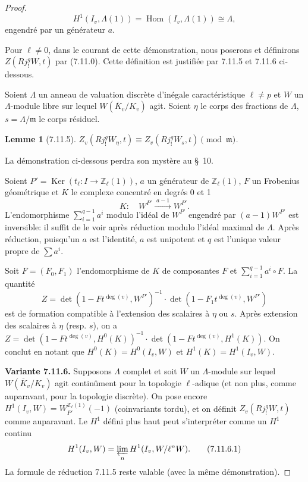\documentclass[11pt]{amsart}
\theoremstyle{plain}
\newtheorem{lemma}[theorem]{Lemme}
\theoremstyle{definition}
\DeclareMathOperator{\Hom}{Hom}
\DeclareMathOperator{\Ker}{Ker}
\begin{document}
\begin{proof}
\begin{equation}
H^1(I_v,\Lambda(1)) = \Hom(I_v,\Lambda(1)) \cong \Lambda,
\tag{7.11.3}
\end{equation}
engendr\'e par un g\'en\'erateur $a$.

Pour $\ell \not= 0$, dans le courant de cette d\'emonstration, nous poserons et d\'efinirons $Z(Rj_!^g W,t)$ par (7.11.0). Cette d\'efinition est justifi\'ee par 7.11.5 et 7.11.6 ci-dessous.

Soient $\Lambda$ un anneau de valuation discr\`ete d'in\'egale caract\'eristique $\ell \not= p$ et $W$ un $\Lambda$-module libre sur lequel $W(\overline{K}_v/K_v)$ agit. Soient $\eta$ le corps des fractions de $\Lambda$, $s = \Lambda/\mathfrak{m}$ le corps r\'esiduel.

\begin{lemma}[7.11.5]
$Z_v(Rj_!^g W_\eta,t) \equiv Z_v(Rj_!^g W_s,t) \pmod{\mathfrak{m}}$.
\end{lemma}

La d\'emonstration ci-dessous perdra son myst\`ere au \S\ 10.

Soient $P' = \Ker(t_\ell: I \to \mathbb{Z}_\ell(1))$, $a$ un g\'en\'erateur de $\mathbb{Z}_\ell(1)$, $F$ un Frobenius g\'eom\'etrique et $K$ le complexe concentr\'e en degr\'es 0 et 1
\[
K: \quad W^{P'} \xrightarrow{\;a-1\;} W^{P'}.
\]
L'endomorphisme $\sum_{i=1}^{q-1} a^i$ modulo l'id\'eal de $W^{P'}$ engendr\'e par $(a-1)W^{P'}$ est inversible: il suffit de le voir apr\`es r\'eduction modulo l'id\'eal maximal de $\Lambda$. Apr\`es r\'eduction, puisqu'un $a$ est l'identit\'e, $a$ est unipotent et $q$ est l'unique valeur propre de $\sum a^i$.

Soit $F = (F_0,F_1)$ l'endomorphisme de $K$ de composantes $F$ et $\sum_{i=1}^{q-1} a^i \circ F$. La quantit\'e
\[
Z = \det(1 - F t^{\deg(v)}, W^{P'})^{-1} \cdot \det(1 - F_1 t^{\deg(v)}, W^{P'})
\]
est de formation compatible \`a l'extension des scalaires \`a $\eta$ ou $s$. Apr\`es extension des scalaires \`a $\eta$ (resp. $s$), on a $Z = \det(1 - F t^{\deg(v)}, H^0(K))^{-1} \cdot \det(1 - F t^{\deg(v)}, H^1(K))$. On conclut en notant que $H^0(K) = H^0(I_v,W)$ et $H^1(K) = H^1(I_v,W)$.

\textbf{Variante 7.11.6.} Supposons $\Lambda$ complet et soit $W$ un $\Lambda$-module sur lequel $W(\overline{K}_v/K_v)$ agit contin\^ument pour la topologie $\ell$-adique (et non plus, comme auparavant, pour la topologie discr\`ete). On pose encore $H^1(I_v,W) = W_{P'}^{\mathbb{Z}_\ell(1)}(-1)$ (coinvariants tordu), et on d\'efinit $Z_v(Rj_!^g W,t)$ comme auparavant. Le $H^1$ d\'efini plus haut peut s'interpr\'eter comme un $H^1$ continu
\begin{equation}
H^1(I_v,W) = \varprojlim_n H^1(I_v,W/\ell^n W).
\tag{7.11.6.1}
\end{equation}
La formule de r\'eduction 7.11.5 reste valable (avec la m\^eme d\'emonstration).


\end{proof}
\end{document}
